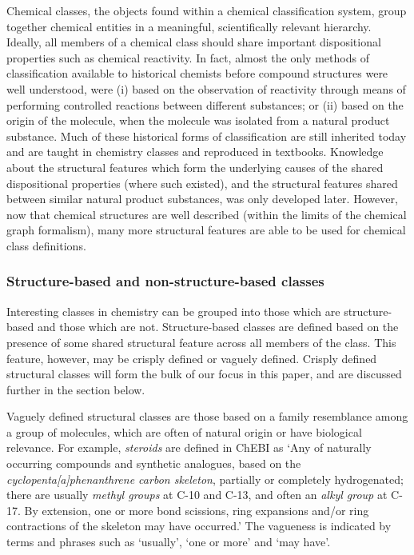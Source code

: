 \documentclass[10pt]{bmc_article}
\newenvironment{bmcformat}{\baselineskip20pt\sloppy\setboolean{publ}{false}}{\baselineskip20pt\sloppy}
\begin{document}
\begin{bmcformat}
Chemical classes, the objects found within a chemical classification system, group together chemical entities in a meaningful, scientifically relevant hierarchy. Ideally, all members of a chemical class should share important dispositional properties such as chemical reactivity. In fact, almost the only methods of classification available to historical chemists before compound structures were well understood, were (i) based on the observation of reactivity through means of performing controlled reactions between different substances; or (ii) based on the origin of the molecule, when the molecule was isolated from a natural product substance. Much of these historical forms of classification are still inherited today and are taught in chemistry classes and reproduced in textbooks. Knowledge about the structural features which form the underlying causes of the shared dispositional properties (where such existed), and the structural features shared between similar natural product substances, was only developed later. However, now that chemical structures are well described (within the limits of the chemical graph formalism), many more structural features are able to be used for chemical class definitions. 

\subsubsection*{Structure-based and non-structure-based classes}
Interesting classes in chemistry can be grouped into those which are structure-based and those which are not. Structure-based classes are defined based on the presence of some shared structural feature across all members of the class.  This feature, however, may be crisply defined or vaguely defined.  Crisply defined structural classes will form the bulk of our focus in this paper, and are discussed further in the section \textit{} below.   

Vaguely defined structural classes are those based on a family resemblance among a group of molecules, which are often of natural origin or have biological relevance.  For example, \textit{steroids} are defined in ChEBI as `Any of naturally occurring compounds and synthetic analogues, based on the \textit{cyclopenta[a]phenanthrene carbon skeleton}, partially or completely hydrogenated; there are usually \textit{methyl groups} at C-10 and C-13, and often an \textit{alkyl group} at C-17. By extension, one or more bond scissions, ring expansions and/or ring contractions of the skeleton may have occurred.'  The vagueness is indicated by terms and phrases such as `usually', `one or more' and `may have'.


\end{bmcformat}
\end{document}
